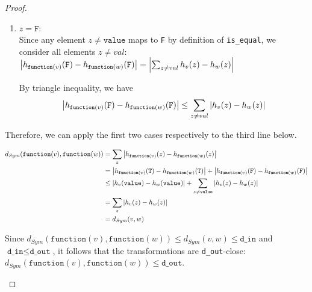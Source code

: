 \documentclass[11pt,a4paper]{article}
\newcommand{\grace}[1]{{ {\color{purple}{(grace)~#1}}}}
\newcommand{\din}{\texttt{d\_in}}
\newcommand{\dout}{\texttt{d\_out}}
\newcommand{\T}{\texttt{T} }
\newcommand{\F}{\texttt{F} }
\newcommand{\function}{\texttt{function}}
\begin{document}
\begin{proof}
\begin{enumerate}
\begin{enumerate}
    \item $z = \F$:\\
    
    Since any element $z \neq \texttt{value}$ maps to \F by definition of \texttt{is\_equal}, we consider all elements $z \neq val$:
    $\abs{h_{\function(v)}(\F) - h_{\function(w)}(\F)} = \abs{\sum_{z \neq val} h_v(z) - h_w(z)}$
    
    By triangle inequality, we have 
    $$\abs{h_{\function(v)}(\F) - h_{\function(w)}(\F)} \leq \sum_{z \neq val} \abs{h_v(z) - h_w(z)}$$
\end{enumerate}


Therefore, we can apply the first two cases respectively to the third line below. 

\begin{align*}
    d_{Sym}(\function(v), \function(w)) &= \sum_z \abs{h_{\function(v)}(z) - h_{\function(w)}(z)} \\
    &= \abs{h_{\function(v)}(\T) - h_{\function(w)}(\T)} + \abs{h_{\function(v)}(\F) - h_{\function(w)}(\F)} \\ 
    &\leq \abs{h_{v}(\texttt{value}) - h_{w}(\texttt{value})} + \sum_{z \neq \texttt{value}} \abs{h_{v}(z) - h_{w}(z)}\\
    &= \sum_z \abs{h_{v}(z) - h_{w}(z)} \\
    &= d_{Sym}(v, w)
\end{align*}

Since $d_{Sym}(\function(v), \function(w)) \leq d_{Sym}(v, w) \leq \din$ and $\din \leq \dout$, it follows that the transformations are \dout-close: $d_{Sym}(\function(v), \function(w)) \leq \dout$.
\grace{TODO in the next round of edits, will use Salil's suggested proof outline with row by row transformation abstraction. This will get rid of casework?}


\end{enumerate}
\end{proof}
\end{document}

